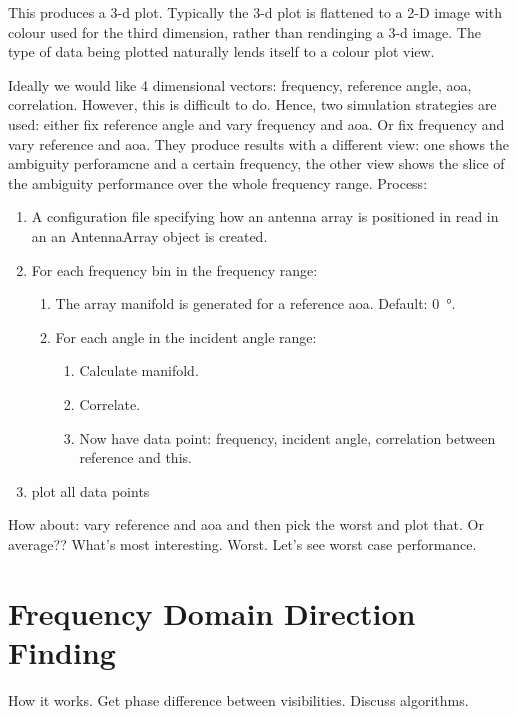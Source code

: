 This produces a 3-d plot. Typically the 3-d plot is flattened to a 2-D image with colour used for the third dimension, rather than rendinging a 3-d image. The type of data being plotted naturally lends itself to a colour plot view.


Ideally we would like 4 dimensional vectors: frequency, reference angle, aoa, correlation. However, this is difficult to do. Hence, two simulation strategies are used: either fix reference angle and vary frequency and aoa. Or fix frequency and vary reference and aoa. They produce results with a different view: one shows the ambiguity perforamcne and a certain frequency, the other view shows the slice of the ambiguity performance over the whole frequency range. Process:

\begin{enumerate}
  \item A configuration file specifying how an antenna array is positioned in read in an an AntennaArray object is created.
  \item For each frequency bin in the frequency range:
  \begin{enumerate}
    \item The array manifold is generated for a reference \gls{aoa}. Default: \SI{0}{\degree}.
    \item For each angle in the incident angle range:
    \begin{enumerate}
      \item Calculate manifold.
      \item Correlate.
      \item Now have data point: frequency, incident angle, correlation between reference and this.
    \end{enumerate}
  \end{enumerate}
  \item plot all data points
\end{enumerate}

How about: vary reference and aoa and then pick the worst and plot that. Or average?? What's most interesting. Worst. Let's see worst case performance. 

\section{Frequency Domain Direction Finding}
How it works. Get phase difference between visibilities. 
Discuss algorithms. 

